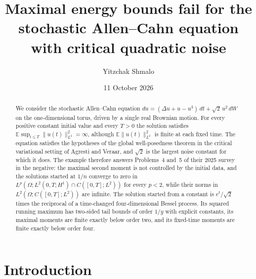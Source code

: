 \documentclass[11pt]{amsart}
\title[Maximal energy bounds and critical quadratic noise]{Maximal energy bounds fail for the stochastic Allen--Cahn equation with critical quadratic noise}
\author{Yitzchak Shmalo}
\date{11 October 2026}
\theoremstyle{remark}
\newcommand{\E}{\mathbb E}
\begin{document}
\begin{abstract}
We consider the stochastic Allen--Cahn equation $du=(\Delta u+u-u^3)\,dt+\sqrt2\,u^2\,dW$ on the one-dimensional torus, driven by a single real Brownian motion. For every positive constant initial value and every $T>0$ the solution satisfies $\E\sup_{t\le T}\|u(t)\|_{L^2}^2=\infty$, although $\E\|u(t)\|_{L^2}^2$ is finite at each fixed time. The equation satisfies the hypotheses of the global well-posedness theorem in the critical variational setting of Agresti and Veraar, and $\sqrt2$ is the largest noise constant for which it does. The example therefore answers Problems~4 and~5 of their 2025 survey in the negative: the maximal second moment is not controlled by the initial data, and the solutions started at $1/n$ converge to zero in $L^p(\Omega;L^2(0,T;H^1)\cap C([0,T];L^2))$ for every $p<2$, while their norms in $L^2(\Omega;C([0,T];L^2))$ are infinite. The solution started from a constant is $e^t/\sqrt2$ times the reciprocal of a time-changed four-dimensional Bessel process. Its squared running maximum has two-sided tail bounds of order $1/y$ with explicit constants, its maximal moments are finite exactly below order two, and its fixed-time moments are finite exactly below order four.
\end{abstract}
\maketitle

\section{Introduction}\label{sec:intro}
\end{document}
